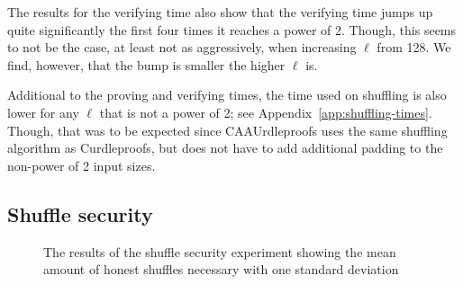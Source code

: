 The results for the verifying time also show that the verifying time jumps up quite significantly the first four times it reaches a power of 2.
Though, this seems to not be the case, at least not as aggressively, when increasing $\ell$ from 128.
We find, however, that the bump is smaller the higher $\ell$ is.

Additional to the proving and verifying times, the time used on shuffling is also lower for any $\ell$ that is not a power of 2; see Appendix~\autoref{app:shuffling-times}.
Though, that was to be expected since CAAUrdleproofs uses the same shuffling algorithm as Curdleproofs, but does not have to add additional padding to the non-power of 2 input sizes.



\subsection{Shuffle security}\label{subsec:Shuffle-security}

\begin{figure}[!htb]
    \centering
    \qquad
    \caption{The results of the shuffle security experiment showing the mean amount of honest shuffles necessary with one standard deviation}%
    \label{fig:shufflesecurity}%
\end{figure}

